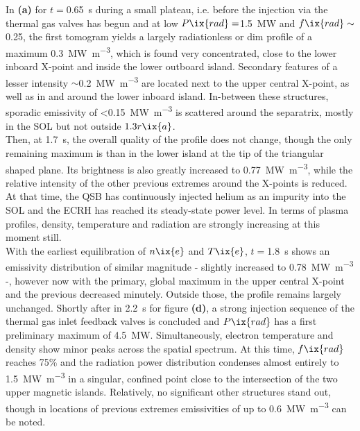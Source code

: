             In \textbf{(a)} for $t=$\SI{0.65}{\second} during a small plateau, i.e. before the injection via the thermal gas valves has begun and at low $P\ix{rad}=$\SI{1.5}{\mega\watt} and $f\ix{rad}\sim$\SI{0.25}{\arbitraryunit}, the first tomogram yields a largely radiationless or dim profile of a maximum \SI{0.3}{\mega\watt\per\cubic\meter}, which is found very concentrated, close to the lower inboard X-point and inside the lower outboard island. Secondary features of a lesser intensity $\sim$\SI{0.2}{\mega\watt\per\cubic\meter} are located next to the upper central X-point, as well as in and around the lower inboard island. In-between these structures, sporadic emissivity of <\SI{0.15}{\mega\watt\per\cubic\meter} is scattered around the separatrix, mostly in the SOL but not outside $1.3r\ix{a}$.\\%
            Then, at \SI{1.7}{\second}, the overall quality of the profile does not change, though the only remaining maximum is than in the lower island at the tip of the triangular shaped plane. Its brightness is also greatly increased to \SI{0.77}{\mega\watt\per\cubic\meter}, while the relative intensity of the other previous extremes around the X-points is reduced. At that time, the QSB has continuously injected helium as an impurity into the SOL and the ECRH has reached its steady-state power level. In terms of plasma profiles, density, temperature and radiation are strongly increasing at this moment still.\\%
            With the earliest equilibration of $n\ix{e}$ and $T\ix{e}$, $t=$\SI{1.8}{\second} shows an emissivity distribution of similar magnitude - slightly increased to \SI{0.78}{\mega\watt\per\cubic\meter} -, however now with the primary, global maximum in the upper central X-point and the previous decreased minutely. Outside those, the profile remains largely unchanged. Shortly after in \SI{2.2}{\second} for figure \textbf{(d)}, a strong injection sequence of the thermal gas inlet feedback valves is concluded and $P\ix{rad}$ has a first preliminary maximum of \SI{4.5}{\mega\watt}. Simultaneously, electron temperature and density show minor peaks across the spatial spectrum. At this time, $f\ix{rad}$ reaches 75\% and the radiation power distribution condenses almost entirely to \SI{1.5}{\mega\watt\per\cubic\meter} in a singular, confined point close to the intersection of the two upper magnetic islands. Relatively, no significant other structures stand out, though in locations of previous extremes emissivities of up to \SI{0.6}{\mega\watt\per\cubic\meter} can be noted.\\%
